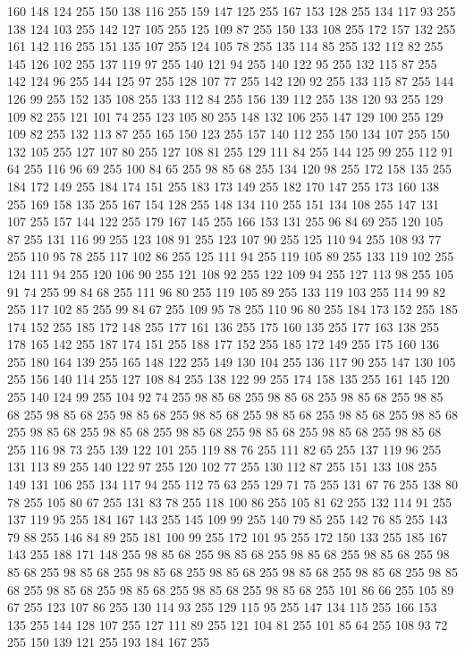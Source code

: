 160 148 124 255 150 138 116 255 159 147 125 255 167 153 128 255 134 117 93 255 138 124 103 255 142 127 105 255 125 109 87 255 150 133 108 255 172 157 132 255 161 142 116 255 151 135 107 255 124 105 78 255 135 114 85 255 132 112 82 255 145 126 102 255 137 119 97 255 140 121 94 255 140 122 95 255 132 115 87 255 142 124 96 255 144 125 97 255 128 107 77 255 142 120 92 255 133 115 87 255 144 126 99 255 152 135 108 255 133 112 84 255 156 139 112 255 138 120 93 255 129 109 82 255 121 101 74 255 123 105 80 255 148 132 106 255 147 129 100 255 129 109 82 255 132 113 87 255 165 150 123 255 157 140 112 255 150 134 107 255 150 132 105 255 127 107 80 255 127 108 81 255 129 111 84 255 144 125 99 255 112 91 64 255 116 96 69 255 100 84 65 255 98 85 68 255 134 120 98 255 172 158 135 255 184 172 149 255 184 174 151 255 183 173 149 255 182 170 147 255 173 160 138 255 169 158 135 255 167 154 128 255 148 134 110 255 151 134 108 255 147 131 107 255 157 144 122 255 179 167 145 255 166 153 131 255
96 84 69 255 120 105 87 255 131 116 99 255 123 108 91 255 123 107 90 255 125 110 94 255 108 93 77 255 110 95 78 255 117 102 86 255 125 111 94 255 119 105 89 255 133 119 102 255 124 111 94 255 120 106 90 255 121 108 92 255 122 109 94 255 127 113 98 255 105 91 74 255 99 84 68 255 111 96 80 255 119 105 89 255 133 119 103 255 114 99 82 255 117 102 85 255 99 84 67 255 109 95 78 255 110 96 80 255 184 173 152 255 185 174 152 255 185 172 148 255 177 161 136 255 175 160 135 255 177 163 138 255 178 165 142 255 187 174 151 255 188 177 152 255 185 172 149 255 175 160 136 255 180 164 139 255 165 148 122 255 149 130 104 255 136 117 90 255 147 130 105 255 156 140 114 255 127 108 84 255 138 122 99 255 174 158 135 255 161 145 120 255 140 124 99 255 104 92 74 255 98 85 68 255 98 85 68 255 98 85 68 255 98 85 68 255 98 85 68 255 98 85 68 255 98 85 68 255 98 85 68 255 98 85 68 255 98 85 68 255 98 85 68 255 98 85 68 255 98 85 68 255 98 85 68 255
98 85 68 255 98 85 68 255 116 98 73 255 139 122 101 255 119 88 76 255 111 82 65 255 137 119 96 255 131 113 89 255 140 122 97 255 120 102 77 255 130 112 87 255 151 133 108 255 149 131 106 255 134 117 94 255 112 75 63 255 129 71 75 255 131 67 76 255 138 80 78 255 105 80 67 255 131 83 78 255 118 100 86 255 105 81 62 255 132 114 91 255 137 119 95 255 184 167 143 255 145 109 99 255 140 79 85 255 142 76 85 255 143 79 88 255 146 84 89 255 181 100 99 255 172 101 95 255 172 150 133 255 185 167 143 255 188 171 148 255 98 85 68 255 98 85 68 255 98 85 68 255 98 85 68 255 98 85 68 255 98 85 68 255 98 85 68 255 98 85 68 255 98 85 68 255 98 85 68 255 98 85 68 255 98 85 68 255 98 85 68 255 98 85 68 255 98 85 68 255 101 86 66 255 105 89 67 255 123 107 86 255 130 114 93 255 129 115 95 255 147 134 115 255 166 153 135 255 144 128 107 255 127 111 89 255 121 104 81 255 101 85 64 255 108 93 72 255 150 139 121 255 193 184 167 255
